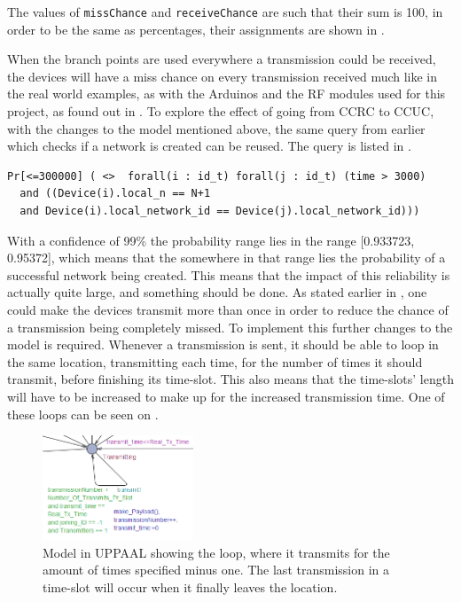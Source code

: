 \noindent
The values of \texttt{missChance} and \texttt{receiveChance} are such that their sum is 100, in order to be the same as percentages, their assignments are shown in .

When the branch points are used everywhere a transmission could be received, the devices will have a miss chance on every transmission received much like in the real world examples, as with the Arduinos and the RF modules used for this project, as found out in .
To explore the effect of going from CCRC to CCUC, with the changes to the model mentioned above, the same query from earlier which checks if a network is created can be reused. 
The query is listed in .

\begin{lstlisting}[style=UPPAAL, caption={Query for UPPAAL which asks for the probability of all devices in a network being equal to the number of devices in the system, and that they all have the same \texttt{network\_id}}, label={query-SuccesfulCreate}]
Pr[<=300000] ( <>  forall(i : id_t) forall(j : id_t) (time > 3000) 
  and ((Device(i).local_n == N+1 
  and Device(i).local_network_id == Device(j).local_network_id)))
\end{lstlisting}

\noindent
With a confidence of 99\% the probability range lies in the range [0.933723, 0.95372], which means that the somewhere in that range lies the probability of a successful network being created.
This means that the impact of this reliability is actually quite large, and something should be done.
As stated earlier in , one could make the devices transmit more than once in order to reduce the chance of a transmission being completely missed.
To implement this further changes to the model is required.
Whenever a transmission is sent, it should be able to loop in the same location, transmitting each time, for the number of times it should transmit, before finishing its time-slot. 
This also means that the time-slots' length will have to be increased to make up for the increased transmission time.
One of these loops can be seen on .

\begin{figure}
\centering
	\vspace{-20pt}
  \includegraphics[width=0.4\textwidth]{Figures/Model/Transmit_Loop.png} 
\caption{Model in UPPAAL showing the loop, where it transmits for the amount of times specified minus one. The last transmission in a time-slot will occur when it finally leaves the location.}
\label{LoopTransmitUPPAAL}
\end{figure}

